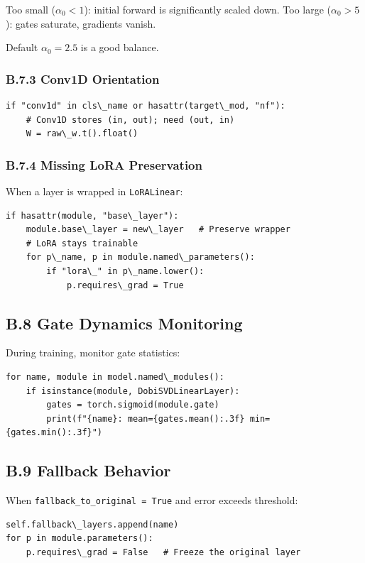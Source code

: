 Too small ($\alpha_0 < 1$): initial forward is significantly scaled down.
Too large ($\alpha_0 > 5$): gates saturate, gradients vanish.

Default $\alpha_0 = 2.5$ is a good balance.

\subsubsection{B.7.3 Conv1D Orientation}

\begin{lstlisting}
if "conv1d" in cls\_name or hasattr(target\_mod, "nf"):
    # Conv1D stores (in, out); need (out, in)
    W = raw\_w.t().float()
\end{lstlisting}

\subsubsection{B.7.4 Missing LoRA Preservation}

When a layer is wrapped in \texttt{LoRALinear}:

\begin{lstlisting}
if hasattr(module, "base\_layer"):
    module.base\_layer = new\_layer   # Preserve wrapper
    # LoRA stays trainable
    for p\_name, p in module.named\_parameters():
        if "lora\_" in p\_name.lower():
            p.requires\_grad = True
\end{lstlisting}

\subsection{B.8 Gate Dynamics Monitoring}

During training, monitor gate statistics:

\begin{lstlisting}
for name, module in model.named\_modules():
    if isinstance(module, DobiSVDLinearLayer):
        gates = torch.sigmoid(module.gate)
        print(f"{name}: mean={gates.mean():.3f} min={gates.min():.3f}")
\end{lstlisting}

\subsection{B.9 Fallback Behavior}

When \texttt{fallback\_to\_original = True} and error exceeds threshold:

\begin{lstlisting}
self.fallback\_layers.append(name)
for p in module.parameters():
    p.requires\_grad = False   # Freeze the original layer
\end{lstlisting}

